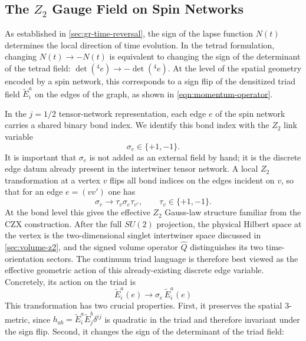 \documentclass[preprint]{SciPost}
\theoremstyle{plain} %
\begin{document}
\subsection{The $ Z_2 $ Gauge Field on Spin Networks}\label{subsec:z2-definition}

As established in \autoref{sec:gr-time-reversal}, the sign of the lapse function $ N(t) $ determines the local direction of time evolution. In the tetrad formulation, changing $ N(t) \rightarrow -N(t) $ is equivalent to changing the sign of the determinant of the tetrad field: $ \det({}^4 e) \rightarrow -\det({}^4 e) $. At the level of the spatial geometry encoded by a spin network, this corresponds to a sign flip of the densitized triad field $ \tilde E^a_i $ on the edges of the graph, as shown in \eqref{eqn:momentum-operator}.

In the $j=1/2$ tensor-network representation, each edge $e$ of the spin network carries a shared binary bond index. We identify this bond index with the $Z_2$ link variable
\begin{equation}\label{eqn:z2-link-variable}
	\sigma_e \in \{+1,-1\}.
\end{equation}
It is important that $\sigma_e$ is not added as an external field by hand; it is the discrete edge datum already present in the intertwiner tensor network. A local $Z_2$ transformation at a vertex $v$ flips all bond indices on the edges incident on $v$, so that for an edge $e=(vv')$ one has
\begin{equation}\label{eqn:z2-gauge-transform}
	\sigma_e \rightarrow \tau_v \sigma_e \tau_{v'}, \qquad \tau_v \in \{+1,-1\}.
\end{equation}
At the bond level this gives the effective $Z_2$ Gauss-law structure familiar from the CZX construction. After the full $SU(2)$ projection, the physical Hilbert space at the vertex is the two-dimensional singlet intertwiner space discussed in \autoref{sec:volume-z2}, and the signed volume operator $\hat Q$ distinguishes its two time-orientation sectors. The continuum triad language is therefore best viewed as the effective geometric action of this already-existing discrete edge variable. Concretely, its action on the triad is
\begin{equation}\label{eqn:z2-triad-action}
	\tilde E^a_i(e) \rightarrow \sigma_e \, \tilde E^a_i(e)
\end{equation}
This transformation has two crucial properties. First, it preserves the spatial 3-metric, since $ h_{ab} = \tilde E^a_i \tilde E^b_j \delta^{ij} $ is quadratic in the triad and therefore invariant under the sign flip. Second, it changes the sign of the determinant of the triad field:
\end{document}
